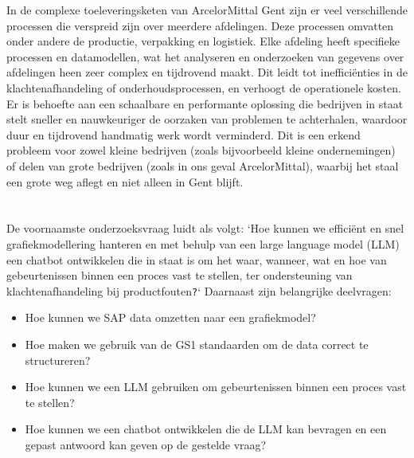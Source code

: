 In de complexe toeleveringsketen van ArcelorMittal Gent zijn er veel verschillende processen die verspreid zijn over meerdere afdelingen. 
Deze processen omvatten onder andere de productie, verpakking en logistiek.
Elke afdeling heeft specifieke processen en datamodellen, wat het analyseren en onderzoeken van gegevens over afdelingen heen zeer complex en tijdrovend maakt. 
Dit leidt tot inefficiënties in de klachtenafhandeling of onderhoudsprocessen, en verhoogt de operationele kosten. 
Er is behoefte aan een schaalbare en performante oplossing die bedrijven in staat stelt sneller en nauwkeuriger de oorzaken van problemen te achterhalen, waardoor duur en tijdrovend handmatig werk wordt verminderd.
Dit is een erkend probleem voor zowel kleine bedrijven (zoals bijvoorbeeld kleine ondernemingen) of delen van grote bedrijven (zoals in ons geval ArcelorMittal), waarbij het staal een grote weg aflegt en niet alleen in Gent blijft.

\section{}%
\label{sec:onderzoeksvraag}

De voornaamste onderzoeksvraag luidt als volgt: `Hoe kunnen we efficiënt en snel grafiekmodellering hanteren en met behulp van een large language model (LLM) een chatbot ontwikkelen die in staat is om het waar, wanneer, wat en hoe van gebeurtenissen binnen een proces vast te stellen, ter ondersteuning van klachtenafhandeling bij productfouten\texttt{?}`
Daarnaast zijn belangrijke deelvragen:
\begin{itemize}
    \item Hoe kunnen we SAP data omzetten naar een grafiekmodel?
    \item Hoe maken we gebruik van de GS1 standaarden om de data correct te structureren?
    \item Hoe kunnen we een LLM gebruiken om gebeurtenissen binnen een proces vast te stellen?
    \item Hoe kunnen we een chatbot ontwikkelen die de LLM kan bevragen en een gepast antwoord kan geven op de gestelde vraag?
\end{itemize}
